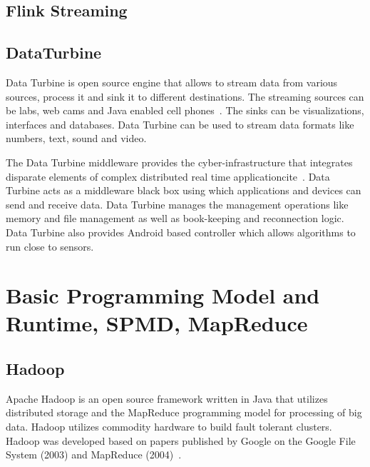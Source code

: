      \pv
     
\subsection{Flink Streaming}

\pv

\subsection{DataTurbine}

Data Turbine is open source engine that allows to stream data from
various sources, process it and sink it to different destinations. The
streaming sources can be labs, web cams and Java enabled cell
phones~\cite{www-data-turbine}.  The sinks can be visualizations,
interfaces and databases.  Data Turbine can be used to stream data
formats like numbers, text, sound and video.

The Data Turbine middleware provides the cyber-infrastructure that
integrates disparate elements of complex distributed real time
applicationcite~\cite{osdt-ecologicalsociety}. Data Turbine acts as a
middleware black box using which applications and devices can send and
receive data. Data Turbine manages the management operations like
memory and file management as well as book-keeping and reconnection
logic.  Data Turbine also provides Android based controller which
allows algorithms to run close to sensors.

     \pv


\section{Basic Programming Model and Runtime, SPMD, MapReduce}
\label{S:o-prg-model}


\subsection{Hadoop}

Apache Hadoop is an open source framework written in Java that
utilizes distributed storage and the MapReduce programming model for
processing of big data. Hadoop utilizes commodity hardware to build
fault tolerant clusters.  Hadoop was developed based on papers
published by Google on the Google File System (2003) and MapReduce
(2004)~\cite{www-wikihadoop}.

